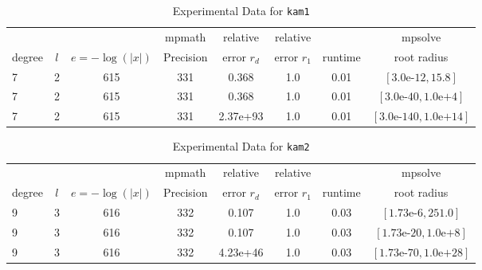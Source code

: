 \documentclass[sigconf]{acmart}
\begin{document}
\begin{table}[t]
\caption{Experimental Data for \texttt{kam1}} %
\label{tab:kam1}
\vskip -0.15in
\begin{center}
\begin{small}
\begin{sc}
\begin{tabular}{lccccccc}
\toprule
&  &  & mpmath & relative  & relative &  & mpsolve \\
degree  & $l$& $e=-\log(|x|)$& Precision &error $r_d$       & error $r_1$ &runtime& root radius\\
\midrule
 7 & 2 & 615 & 331 & 0.368 & 1.0 & 0.01 & $[3.0\text{e-}12, 15.8]$\\
 7 & 2 & 615 & 331 & 0.368 & 1.0 & 0.01 & $[3.0\text{e-}40, 1.0\text{e+}4]$\\
 7 & 2 & 615 & 331 & 2.37e+93 & 1.0 & 0.01 & $[3.0\text{e-}140, 1.0\text{e+}14]$\\
\bottomrule
\end{tabular}
\end{sc}
\end{small}
\end{center}
\vskip 0.05in
\end{table}

\begin{table}[t]
\caption{Experimental Data for \texttt{kam2}} %
\label{tab:kam2}
\vskip -0.15in
\begin{center}
\begin{small}
\begin{sc}
\begin{tabular}{lccccccc}
\toprule
&  &  & mpmath & relative  & relative &  & mpsolve \\
degree  & $l$& $e=-\log(|x|)$& Precision &error $r_d$       & error $r_1$ &runtime& root radius\\
\midrule
 9 & 3 & 616 & 332 & 0.107 & 1.0 & 0.03 & $[1.73\text{e-}6, 251.0]$\\
 9 & 3 & 616 & 332 & 0.107 & 1.0 & 0.03 & $[1.73\text{e-}20, 1.0\text{e+}8]$\\
 9 & 3 & 616 & 332 & 4.23e+46 & 1.0 & 0.03 & $[1.73\text{e-}70, 1.0\text{e+}28]$\\
\bottomrule
\end{tabular}
\end{sc}
\end{small}
\end{center}
\vskip 0.05in
\end{table}
\end{document}
